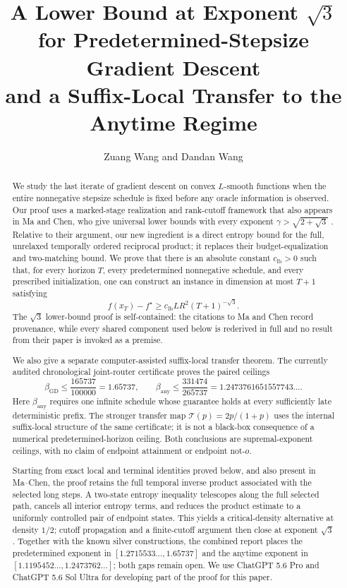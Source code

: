 \documentclass[11pt]{article}
\title{\bfseries
A Lower Bound at Exponent \(\sqrt{3}\) for Predetermined-Stepsize Gradient Descent\\
\large and a Suffix-Local Transfer to the Anytime Regime}
\author{Zuang Wang and Dandan Wang}
\theoremstyle{definition}
\theoremstyle{remark}
\newcommand{\gdexp}{\beta_{\mathrm{GD}}}
\newcommand{\anyexp}{\beta_{\mathrm{any}}}
\newcommand{\Transfer}{\mathcal T}
\newcommand{\lbconst}{c_{\mathrm{lb}}}
\begin{document}
\maketitle

\begin{abstract}
We study the last iterate of gradient descent on convex \(L\)-smooth
functions when the entire nonnegative stepsize schedule is fixed before any
oracle information is observed.  Our proof uses a marked-stage realization
and rank-cutoff framework that also appears in Ma and Chen, who give universal
lower bounds with every exponent \(\gamma>\sqrt{2+\sqrt3}\)
\cite{machen2026}.  Relative to their argument, our new ingredient is a
direct entropy bound for the full,
unrelaxed temporally ordered reciprocal product; it replaces their
budget-equalization and two-matching bound.  We prove that there is an
absolute constant
\(\lbconst>0\)
such that, for every horizon \(T\), every predetermined nonnegative schedule,
and every prescribed initialization, one can construct an instance in
dimension at most \(T+1\) satisfying
\[
 f(x_T)-f^\star
 \ge \lbconst LR^2(T+1)^{-\sqrt3}.
\]
The \(\sqrt3\) lower-bound proof is self-contained: the citations to Ma and Chen record
provenance, while every shared component used below is rederived in full and
no result from their paper is invoked as a premise.

We also give a separate computer-assisted suffix-local transfer theorem.  The
currently audited chronological joint-router certificate proves the paired
ceilings
\[
 \boxed{
 \gdexp\le\frac{165737}{100000}=1.65737,
 \qquad
 \anyexp\le\frac{331474}{265737}
 =1.2473761651557743\ldots .}
\]
Here \(\anyexp\) requires one infinite schedule whose guarantee holds at every
sufficiently late deterministic prefix.  The stronger transfer map
\(\Transfer(p)=2p/(1+p)\) uses the internal suffix-local structure of the
same certificate; it is not a black-box consequence of a numerical
predetermined-horizon ceiling.  Both conclusions are supremal-exponent
ceilings, with no claim of endpoint attainment or endpoint
\(\mathrm{not}\text{-}o\).

Starting from exact local and terminal identities proved below, and also
present in Ma--Chen, the proof retains the full temporal inverse product
associated with the selected long steps.  A two-state
entropy inequality telescopes along the full selected path, cancels all
interior entropy terms, and reduces the product estimate to a uniformly
controlled pair of endpoint states.  This yields a critical-density
alternative at density \(1/2\); cutoff propagation and a finite-cutoff
argument then close at exponent \(\sqrt3\).  Together with the known silver
constructions, the combined report places the predetermined exponent in
\([1.2715533\ldots,1.65737]\) and the anytime exponent in
\([1.1195452\ldots,1.2473762\ldots]\); both gaps remain open. We use ChatGPT 5.6 Pro and
ChatGPT 5.6 Sol Ultra for developing part of the proof for this paper.
\end{abstract}
\end{document}
